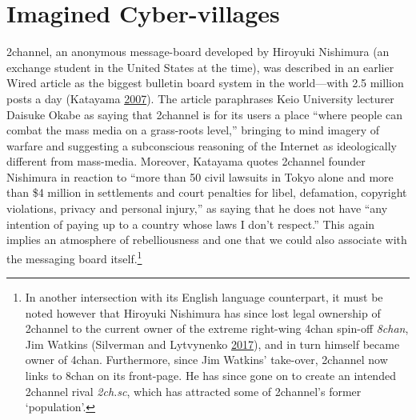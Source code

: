 \documentclass[10pt,british,A4paper,oneside]{memoir}
\begin{document}
\section{Imagined Cyber-villages}\label{imagined-cyber-villages}

2channel, an anonymous message-board developed by Hiroyuki Nishimura (an
exchange student in the United States at the time), was described in an
earlier Wired article as the biggest bulletin board system in the
world---with 2.5 million posts a day (Katayama
\protect\hyperlink{ref-katayama_2-channel_2007}{2007}). The article
paraphrases Keio University lecturer Daisuke Okabe as saying that 2channel is for its users a
place ``where people can combat the mass media on a grass-roots level,''
bringing to mind imagery of warfare and suggesting a subconscious
reasoning of the Internet as ideologically different from mass-media.
Moreover, Katayama quotes 2channel founder Nishimura in reaction to
``more than 50 civil lawsuits in Tokyo alone and more than \$4 million
in settlements and court penalties for libel, defamation, copyright
violations, privacy and personal injury,'' as saying that he does not
have ``any intention of paying up to a country whose laws I don't
respect.'' This again implies an atmosphere of rebelliousness and one
that we could also associate with the messaging board itself.\footnote{In another intersection with its English language
  counterpart, it must be noted however that Hiroyuki Nishimura has
  since lost legal ownership of 2channel to the current owner of the
  extreme right-wing 4chan spin-off \emph{8chan}, Jim Watkins (Silverman
  and Lytvynenko \protect\hyperlink{ref-silverman_meet_2017}{2017}), and
  in turn himself became owner of 4chan. Furthermore, since Jim Watkins'
  take-over, 2channel now links to 8chan on its front-page. He has since
  gone on to create an intended 2channel rival \emph{2ch.sc}, which has
  attracted some of 2channel's former `population'.}
\end{document}
